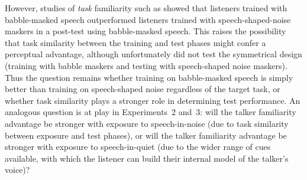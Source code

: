 However, studies of {\em task} familiarity such as \citet{VanEngen2012} showed that listeners trained with babble-masked speech outperformed listeners trained with speech-shaped-noise maskers in a post-test using babble-masked speech.  This raises the possibility that task similarity between the training and test phases might confer a perceptual advantage, although unfortunately \citeauthor{VanEngen2012} did not test the symmetrical design (training with babble maskers and testing with speech-shaped noise maskers).  Thus the question remains whether training on babble-masked speech is simply better than training on speech-shaped noise regardless of the target task, or whether task similarity plays a stronger role in determining test performance.  An analogous question is at play in Experiments~2 and~3: will the talker familiarity advantage be stronger with exposure to speech-in-noise (due to task similarity between exposure and test phases), or will the talker familiarity advantage be stronger with exposure to speech-in-quiet (due to the wider range of cues available, with which the listener can build their internal model of the talker’s voice)?
 


